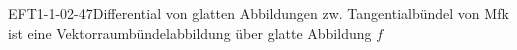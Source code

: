 
\begin{EXA}{EFT1-1-02-47}{Differential von glatten Abbildungen zw. Tangentialbündel von Mfk ist eine Vektorraumbündelabbildung über glatte Abbildung $f$}
\end{EXA}
